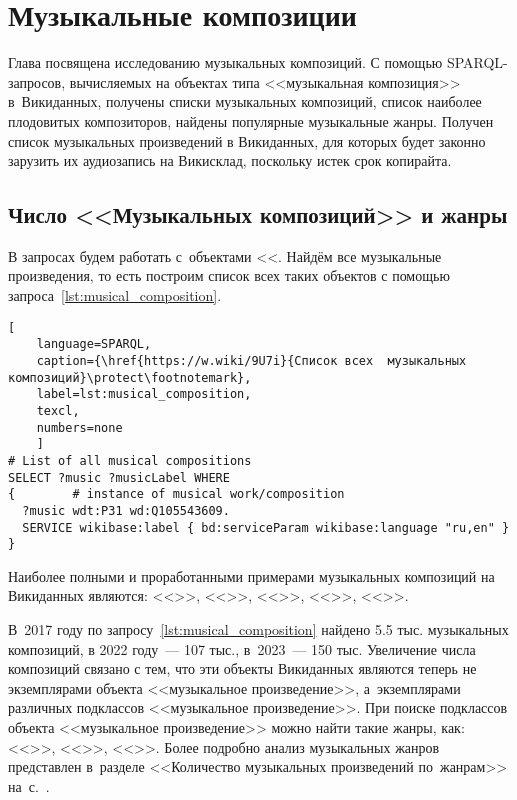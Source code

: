 \chapter{Музыкальные композиции}
\label{ch:musical-composition}
Глава посвящена исследованию музыкальных композиций. 
С помощью SPARQL-запросов, вычисляемых на объектах типа <<музыкальная композиция>> в~Викиданных, 
получены списки музыкальных композиций, список наиболее плодовитых композиторов, 
найдены популярные музыкальные жанры. 
Получен список музыкальных произведений в Викиданных, 
для которых будет законно зарузить их аудиозапись на Викисклад, поскольку истек срок копирайта.

\section{Число <<Музыкальных композиций>> и жанры}

В запросах будем работать с~объектами <<. 
Найдём все музыкальные произведения, то есть 
построим список всех таких объектов с помощью запроса~\ref{lst:musical_composition}.

\begin{lstlisting}[ 
    language=SPARQL,
    caption={\href{https://w.wiki/9U7i}{Список всех  музыкальных композиций}\protect\footnotemark},
    label=lst:musical_composition,
    texcl,
    numbers=none
    ]
# List of all musical compositions
SELECT ?music ?musicLabel WHERE
{        # instance of musical work/composition
  ?music wdt:P31 wd:Q105543609. 
  SERVICE wikibase:label { bd:serviceParam wikibase:language "ru,en" }
}
\end{lstlisting}%

Наиболее полными и проработанными примерами музыкальных композиций на Викиданных являются: <<>>, <<>>, <<>>, <<>>, <<>>.

В~2017 году по запросу~\ref{lst:musical_composition} найдено \num{5,5} тыс. музыкальных композиций, 
в 2022 году~--- 107 тыс., в~2023~--- 150 тыс. 
Увеличение числа композиций связано с тем, 
что эти объекты Викиданных являются теперь не экземплярами объекта <<музыкальное произведение>>, 
а~экземплярами различных подклассов <<музыкальное произведение>>. 
При поиске подклассов объекта <<музыкальное произведение>> можно найти такие жанры, как: 
<<>>, 
<<>>, 
<<>>. 
Более подробно анализ музыкальных жанров представлен в~разделе 
<<Количество музыкальных произведений по~жанрам>> на~с.~\pageref{chapter:Number-of-musical-works-by-genre}.


